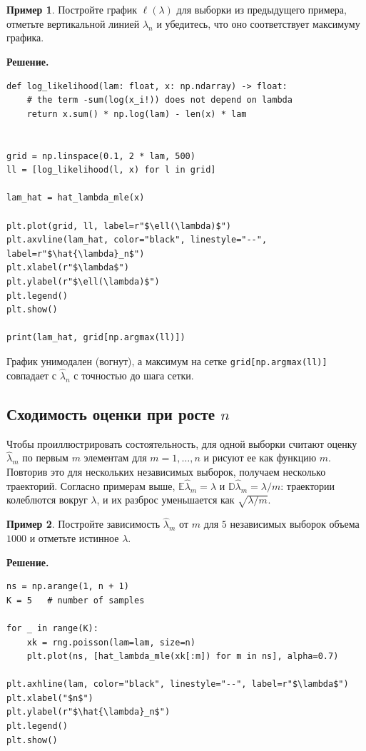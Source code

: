 \documentclass[a4paper,12pt]{article}
\theoremstyle{definition}
\newtheorem{example}{Пример}
\theoremstyle{plain}
\theoremstyle{remark}
\newcommand{\E}{\mathbb{E}}
\newcommand{\D}{\mathbb{D}}
\begin{document}
\begin{example}
Постройте график $\ell(\lambda)$ для выборки из предыдущего примера, отметьте вертикальной линией $\hat\lambda_n$ и убедитесь, что оно соответствует максимуму графика.
\end{example}

\noindent\textbf{Решение.}
\begin{lstlisting}
def log_likelihood(lam: float, x: np.ndarray) -> float:
    # the term -sum(log(x_i!)) does not depend on lambda
    return x.sum() * np.log(lam) - len(x) * lam


grid = np.linspace(0.1, 2 * lam, 500)
ll = [log_likelihood(l, x) for l in grid]

lam_hat = hat_lambda_mle(x)

plt.plot(grid, ll, label=r"$\ell(\lambda)$")
plt.axvline(lam_hat, color="black", linestyle="--", label=r"$\hat{\lambda}_n$")
plt.xlabel(r"$\lambda$")
plt.ylabel(r"$\ell(\lambda)$")
plt.legend()
plt.show()

print(lam_hat, grid[np.argmax(ll)])
\end{lstlisting}
График унимодален (вогнут), а максимум на сетке \lstinline|grid[np.argmax(ll)]| совпадает с $\hat\lambda_n$ с точностью до шага сетки.

\subsection{Сходимость оценки при росте $n$}

Чтобы проиллюстрировать состоятельность, для одной выборки считают оценку $\hat\lambda_m$ по первым $m$ элементам для $m=1,\dots,n$ и рисуют ее как функцию $m$. Повторив это для нескольких независимых выборок, получаем несколько траекторий. Согласно примерам выше, $\E\hat\lambda_m=\lambda$ и $\D\hat\lambda_m=\lambda/m$: траектории колеблются вокруг $\lambda$, и их разброс уменьшается как $\sqrt{\lambda/m}$.

\begin{example}
Постройте зависимость $\hat\lambda_m$ от $m$ для $5$ независимых выборок объема $1000$ и отметьте истинное $\lambda$.
\end{example}

\noindent\textbf{Решение.}
\begin{lstlisting}
ns = np.arange(1, n + 1)
K = 5   # number of samples

for _ in range(K):
    xk = rng.poisson(lam=lam, size=n)
    plt.plot(ns, [hat_lambda_mle(xk[:m]) for m in ns], alpha=0.7)

plt.axhline(lam, color="black", linestyle="--", label=r"$\lambda$")
plt.xlabel("$n$")
plt.ylabel(r"$\hat{\lambda}_n$")
plt.legend()
plt.show()
\end{lstlisting}
\end{document}
